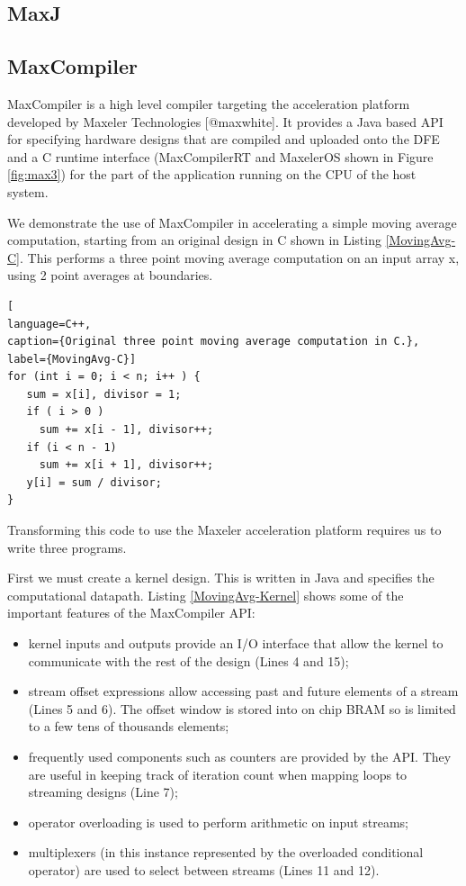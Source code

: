 \subsection{MaxJ}

\subsection{MaxCompiler}

MaxCompiler is a high level compiler targeting the acceleration
platform developed by Maxeler Technologies [@maxwhite]. It provides a
Java based API for specifying hardware designs that are compiled and
uploaded onto the DFE and a C runtime interface (MaxCompilerRT and
MaxelerOS shown in Figure \ref{fig:max3}) for the part of the
application running on the CPU of the host system.

We demonstrate the use of MaxCompiler in accelerating a simple moving
average computation, starting from an original design in C shown in
Listing \ref{MovingAvg-C}. This performs a three point moving average
computation on an input array x, using 2 point averages at boundaries.

\begin{lstlisting}[
language=C++,
caption={Original three point moving average computation in C.},
label={MovingAvg-C}]
for (int i = 0; i < n; i++ ) {
   sum = x[i], divisor = 1;
   if ( i > 0 )
     sum += x[i - 1], divisor++;
   if (i < n - 1)
     sum += x[i + 1], divisor++;
   y[i] = sum / divisor;
}
\end{lstlisting}



Transforming this code to use the Maxeler acceleration platform
requires us to write three programs.

First we must create a kernel design. This is written in Java and
specifies the computational datapath. Listing \ref{MovingAvg-Kernel}
shows some of the important features of the MaxCompiler API:


\begin{itemize}

\item kernel inputs and outputs provide an I/O interface that allow the
  kernel to communicate with the rest of the design (Lines 4 and 15);

\item stream offset expressions allow accessing past and future elements
  of a stream (Lines 5 and 6). The offset window is stored into on
  chip BRAM so is limited to a few tens of thousands elements;

\item frequently used components such as counters are provided by the
  API. They are useful in keeping track of iteration count when
  mapping loops to streaming designs (Line 7);

\item operator overloading is used to perform arithmetic on input streams;

\item multiplexers (in this instance represented by the overloaded
  conditional operator) are used to select between streams (Lines 11
  and 12).

\end{itemize}

